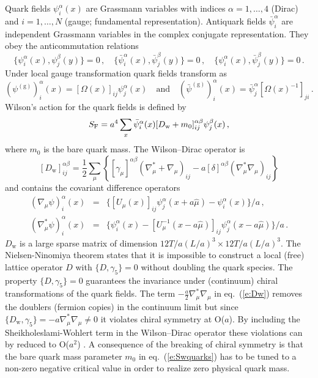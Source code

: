 \documentclass{PoS}
\newcommand{\eq}[1]{eq.~(\ref{#1})}
\newcommand{\gauge} [3][U]{\ensuremath{#1_{#2}(#3)}}
\def\Dw{D_{\mathrm{w}}}
\begin{document}
Quark fields $\psi_i^\alpha(x)$ are Grassmann variables with indices
$\alpha=1,\ldots,4$ (Dirac) and $i=1,\ldots,N$ (gauge; 
fundamental representation).
Antiquark fields $\bar{\psi}_i^\alpha$ are independent Grassmann variables
in the complex conjugate representation.
They obey the anticommutation relations
\begin{equation}\label{e:quarks}
\{ \psi^\alpha_i(x) , \psi^\beta_j(y) \} = 0 \,,\quad
\{ \bar{\psi}^\alpha_i(x) , \bar{\psi}^\beta_j(y) \} = 0 \,,\quad
\{ \psi^\alpha_i(x) , \bar{\psi}^\beta_j(y) \} = 0 \,.
\end{equation}
Under local gauge transformation quark fields transform as
\begin{equation}\label{e:quarks_gtrsf}
(\psi^{\mathrm{(g)}})_i^\alpha(x)=[\Omega(x)]_{ij}\psi^\alpha_j(x)
\quad\mbox{and}\quad
(\bar{\psi}^{\mathrm{(g)}})^\alpha_i(x)=\bar{\psi}_j^\alpha[\Omega(x)^{-1}]_{ji} \,.
\end{equation}
Wilson's action for the quark fields is defined by
\begin{equation}\label{e:Swquarks}
S_{\rm F} = a^4\sum_x \bar{\psi}_i^\alpha(x)[\Dw+m_0]_{ij}^{\alpha\beta}\psi_j^\beta(x)\,,
\end{equation}
where $m_0$ is the bare quark mass. The Wilson--Dirac operator is
\begin{equation}\label{e:Dw}
[\Dw]^{\alpha\beta}_{ij} = \frac{1}{2}\sum_\mu\left\{
[\gamma_\mu]^{\alpha\beta}(\nabla^*_\mu+\nabla_\mu)_{ij}
-a[\delta]^{\alpha\beta}(\nabla^*_\mu\nabla_\mu)_{ij}\right\}
\end{equation}
and contains the covariant difference operators
\begin{eqnarray}
(\nabla_\mu\psi)^\alpha_i(x) & = &
\{[\gauge{\mu}{x}]_{ij}\psi^\alpha_j(x+a\hat{\mu})-\psi_i^\alpha(x)\}/a \,, 
\label{e:covder_forward}\\
(\nabla^*_\mu\psi)^\alpha_i(x) & = & 
\{\psi^\alpha_i(x)
-[\gauge[U^{-1}]{\mu}{x-a\hat{\mu}}]_{ij}\psi^\alpha_j(x-a\hat{\mu})\}/a \,.
\label{e:covder_backward}
\end{eqnarray}
$\Dw$ is a large sparse matrix of dimension $12 T/a (L/a)^3 \times 12 T/a (L/a)^3$. 
The Nielsen-Ninomiya theorem states that
it is impossible to construct a local (free) lattice operator $D$ with 
$\{D,\gamma_5\} = 0$ without doubling the quark species.
The property $\{D,\gamma_5\} = 0$ guarantees the invariance under
(continuum) chiral transformations of the quark fields.
The term $-\frac{a}{2}\nabla^*_\mu\nabla_\mu$ in \eq{e:Dw} removes the
doublers (fermion copies) in the continuum limit but since 
$\{\Dw,\gamma_5\}=-a\nabla^*_\mu\nabla_\mu\neq0$ it violates chiral symmetry
at O($a$). By including the Sheikholeslami-Wohlert term in the Wilson--Dirac 
operator these violations can by reduced to O($a^2$) \cite{Sheikholeslami:1985ij,Heatlie:1990kg}.
A consequence of the breaking of chiral symmetry is that the bare quark
mass parameter $m_0$ in \eq{e:Swquarks} has to be tuned to a non-zero
negative critical value in order to realize zero physical quark mass.
\end{document}
